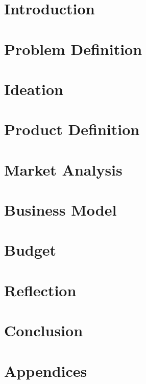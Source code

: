 \documentclass[11pt, a4paper]{article}
\begin{document}
\begin{multicols}{2}
	



\section{Introduction}
\label{sec:intro}


\section{Problem Definition}
\label{sec:problemDefinition}


\section{Ideation}
\label{sec:ideation}


\section{Product Definition}
\label{sec:productDefinition}


\section{Market Analysis}
\label{sec:marketanlysis}


\section{Business Model}
\label{sec:businessModel}


\section{Budget}
\label{sec:budget}


\section{Reflection}
\label{sec:reflection}


\section{Conclusion}
\label{sec:conclusion}

\end{multicols}
\newpage

\begin{multicols}{2}


\columnbreak
\listoftables
\listoffigures
\end{multicols}

\label{end}
\newpage
\section*{\Huge{Appendices}}

\end{document}
